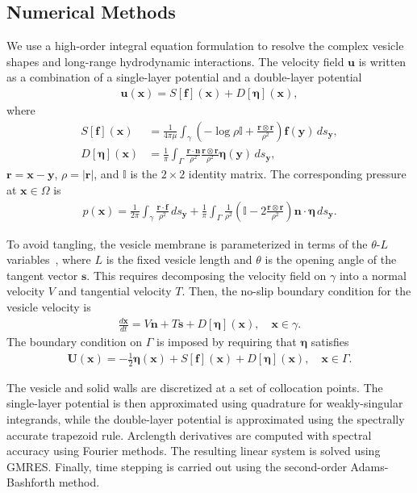 \documentclass[twoside,twocolumn,9pt]{article}
\newcommand{\ff}{\mathbf{f}}
\newcommand{\eeta}{\boldsymbol{\eta}}
\newcommand{\nn}{\mathbf{n}}
\newcommand{\rr}{\mathbf{r}}
\renewcommand{\ss}{\mathbf{s}}
\newcommand{\uu}{\mathbf{u}}
\newcommand{\UU}{\mathbf{U}}
\newcommand{\xx}{\mathbf{x}}
\newcommand{\yy}{\mathbf{y}}
\begin{document}
\subsection{\label{sec:NumericalMethods}Numerical Methods}
We use a high-order integral equation formulation to resolve the complex
vesicle shapes and long-range hydrodynamic interactions. The velocity
field $\uu$ is written as a combination of a single-layer potential and
a double-layer potential
\begin{align}
  \label{eqn:LPrep}
  \uu(\xx) = S[\ff](\xx) + D[\eeta](\xx),
\end{align}
where
\begin{align}
  S[\ff](\xx) &= \frac{1}{4\pi\mu} \int_{\gamma} \left(
    -\log \rho \mathds{I} + \frac{\rr \otimes \rr}{\rho^2} \right)
    \ff(\yy) \, ds_\yy, \\
%
    D[\eeta](\xx) &= \frac{1}{\pi} \int_{\Gamma} 
      \frac{\rr \cdot \nn}{\rho^2} 
      \frac{\rr \otimes \rr}{\rho^2} \eeta(\yy) \, ds_\yy,
\end{align}
$\rr = \xx - \yy$, $\rho = |\rr|$, and $\mathds{I}$ is the $2 \times 2$
identity matrix. The corresponding pressure at $\xx \in \Omega$ is
\begin{align}
  p(\xx) = \frac{1}{2\pi} \int_{\gamma} \frac{\rr \cdot \ff}{\rho^2} \, ds_\yy + 
    \frac{1}{\pi} \int_{\Gamma} \frac{1}{\rho^2} 
    \left(\mathds{I} - 2\frac{\rr \otimes \rr}{\rho^2} \right) 
    \nn \cdot \eeta \, ds_\yy.
\end{align}

To avoid tangling, the vesicle membrane is parameterized in terms of the
$\theta$-$L$ variables~\cite{hou-low-she1994}, where $L$ is the fixed
vesicle length and $\theta$ is the opening angle of the tangent vector
$\ss$. This requires decomposing the velocity field on $\gamma$ into a
normal velocity $V$ and tangential velocity $T$. Then, the no-slip
boundary condition for the vesicle velocity is
\begin{align}
  \frac{d\xx}{dt} = V \nn + T \ss + D[\eeta](\xx), \quad \xx \in \gamma.
\end{align}
The boundary condition on $\Gamma$ is imposed by requiring that $\eeta$
satisfies
\begin{align}
  \UU(\xx) = -\frac{1}{2}\eeta(\xx) + 
    S[\ff](\xx) + D[\eeta](\xx), \quad \xx \in \Gamma.
  \label{eqn:DLP_BIE}
\end{align}

The vesicle and solid walls are discretized at a set of collocation
points. The single-layer potential is then approximated using quadrature
for weakly-singular integrands, while the double-layer potential is
approximated using the spectrally accurate trapezoid rule. Arclength
derivatives are computed with spectral accuracy using Fourier methods.
The resulting linear system is solved using GMRES. Finally, time
stepping is carried out using the second-order Adams-Bashforth method. 
\end{document}
